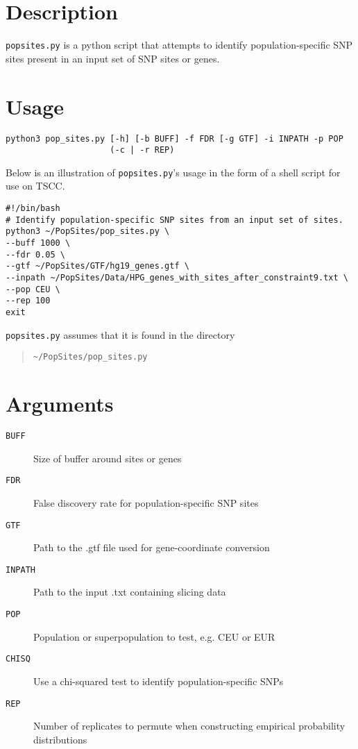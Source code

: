 \documentclass[12pt]{scrartcl}
\begin{document}
\maketitle
\section{Description}
\texttt{pop{\textunderscore}sites.py} is a python script that attempts to  identify population-specific SNP sites present in an input set of SNP sites or genes. 
\section{Usage}
\begin{verbatim}
python3 pop_sites.py [-h] [-b BUFF] -f FDR [-g GTF] -i INPATH -p POP
                     (-c | -r REP)
\end{verbatim}
Below is an illustration of \texttt{pop{\textunderscore}sites.py}'s usage in the form of a shell script for use on TSCC.
\begin{verbatim}
#!/bin/bash
# Identify population-specific SNP sites from an input set of sites.
python3 ~/PopSites/pop_sites.py \
--buff 1000 \
--fdr 0.05 \
--gtf ~/PopSites/GTF/hg19_genes.gtf \
--inpath ~/PopSites/Data/HPG_genes_with_sites_after_constraint9.txt \
--pop CEU \
--rep 100
exit
\end{verbatim}
\texttt{pop{\textunderscore}sites.py} assumes that it is found in the directory
\begin{quote}
\begin{verbatim}
~/PopSites/pop_sites.py
\end{verbatim}
\end{quote}

\section{Arguments}
\begin{description}
\item[\texttt{BUFF}] Size of buffer around sites or genes
\item[\texttt{FDR}] False discovery rate for population-specific SNP sites
\item[\texttt{GTF}] Path to the .gtf file used for gene-coordinate conversion
\item[\texttt{INPATH}] Path to the input .txt containing slicing data
\item[\texttt{POP}] Population or superpopulation to test, e.g. CEU or EUR
\item[\texttt{CHISQ}] Use a chi-squared test to identify population-specific SNPs
\item[\texttt{REP}] Number of replicates to permute when constructing empirical probability distributions
\end{description}
\end{document}
